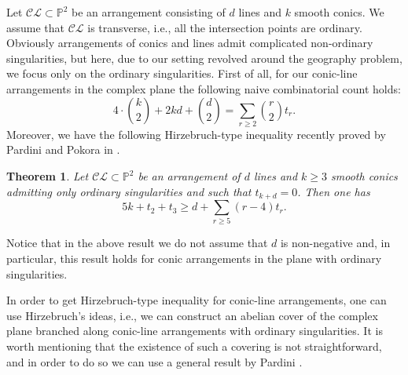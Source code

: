 \documentclass{article}
\theoremstyle{plain}
\newtheorem{theorem}[thm]{Theorem}
\theoremstyle{definition}
\numberwithin{equation}{section}
\begin{document}
Let $\mathcal{CL}\subset \mathbb{P}^{2}$ be an arrangement consisting of $d$ lines and $k$ smooth conics. We assume that $\mathcal{CL}$ is transverse, i.e., all the intersection points are ordinary. Obviously arrangements of conics and lines admit complicated non-ordinary singularities, but here, due to our setting revolved around the geography problem, we focus only on the ordinary singularities. First of all, for our conic-line arrangements in the complex plane the following naive combinatorial count holds:
\begin{equation}
4\cdot\binom{k}{2} + 2kd + \binom{d}{2} = \sum_{r\geq 2} \binom{r}{2}t_{r}.
\end{equation}
Moreover, we have the following Hirzebruch-type inequality recently proved by Pardini and Pokora in \cite{RPPP}.
\begin{theorem}
\label{HirCL}
Let $\mathcal{CL} \subset \mathbb{P}^{2}$ be an arrangement of $d$ lines and $k\geq 3$ smooth conics admitting only ordinary singularities and such that $t_{k+d}=0$. Then one has
\begin{equation}
5k + t_{2} + t_{3} \geq d + \sum_{r\geq 5}(r-4)t_{r}.
\end{equation}
\end{theorem}
Notice that in the above result we do not assume that $d$ is non-negative and, in particular, this result holds for conic arrangements in the plane with ordinary singularities.

In order to get Hirzebruch-type inequality for conic-line arrangements, one can use Hirzebruch's ideas, i.e., we can construct an abelian cover of the complex plane branched along conic-line arrangements with ordinary singularities. It is worth mentioning that the existence of such a covering is not straightforward, and in order to do so we can use a general result by Pardini \cite{RP}.
\end{document}
